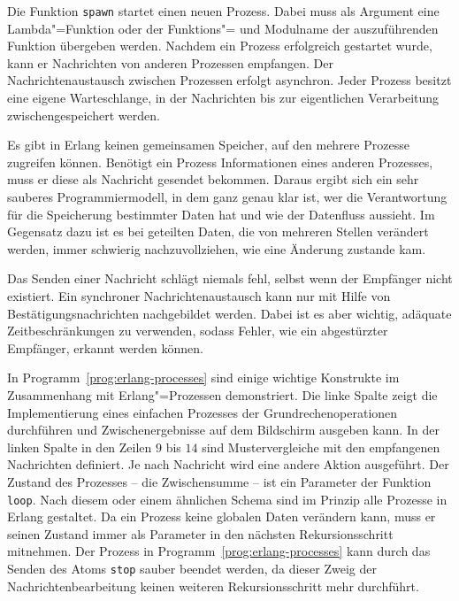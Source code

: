 Die Funktion \lstinline{spawn} startet einen neuen Prozess. Dabei muss als Argument eine Lambda"=Funktion oder der Funktions"= und Modulname der auszuführenden Funktion übergeben werden. Nachdem ein Prozess erfolgreich ge\-star\-tet wurde, kann er Nachrichten von anderen Prozessen empfangen. Der Nachrichtenaustausch zwischen Prozessen erfolgt asynchron. Jeder Prozess besitzt eine eigene Warteschlange, in der Nachrichten bis zur eigentlichen Verarbeitung zwischengespeichert werden.

Es gibt in Erlang keinen gemeinsamen Speicher, auf den mehrere Prozesse zugreifen können. Benötigt ein Prozess Informationen eines anderen Prozesses, muss er diese als Nachricht gesendet bekommen. Daraus ergibt sich ein sehr sauberes Programmiermodell, in dem ganz genau klar ist, wer die Verantwortung für die Speicherung bestimmter Daten hat und wie der Datenfluss aussieht. Im Gegensatz dazu ist es bei geteilten Daten, die von mehreren Stellen verändert werden, immer schwierig nachzuvollziehen, wie eine Änderung zustande kam.

Das Senden einer Nachricht schlägt niemals fehl, selbst wenn der Empfänger nicht existiert. Ein synchroner Nachrichtenaustausch kann nur mit Hilfe von Bestätigungsnachrichten nachgebildet werden. Dabei ist es aber wichtig, adäquate Zeitbeschränkungen zu verwenden, sodass Fehler, wie \zB ein abgestürzter Empfänger, erkannt werden können.

In Programm~\ref{prog:erlang-processes} sind einige wichtige Konstrukte im Zusammenhang mit Erlang"=Prozessen demonstriert. Die linke Spalte zeigt die Implementierung eines einfachen Prozesses der Grundrechenoperationen durchführen und Zwischenergebnisse auf dem Bildschirm ausgeben kann. In der linken Spalte in den Zeilen $9$ bis $14$ sind Mustervergleiche mit den empfangenen Nachrichten definiert. Je nach Nachricht wird eine andere Aktion ausgeführt. Der Zustand des Prozesses -- die Zwischensumme -- ist ein Parameter der Funktion \lstinline{loop}. Nach diesem oder einem ähnlichen Schema sind im Prinzip alle Prozesse in Erlang gestaltet. Da ein Prozess keine globalen Daten verändern kann, muss er seinen Zustand immer als Parameter in den nächsten Rekursionsschritt mitnehmen. Der Prozess in Programm~\ref{prog:erlang-processes} kann durch das Senden des Atoms \lstinline{stop} sauber beendet werden, da dieser Zweig der Nachrichtenbearbeitung keinen weiteren Rekursionsschritt mehr durchführt.


